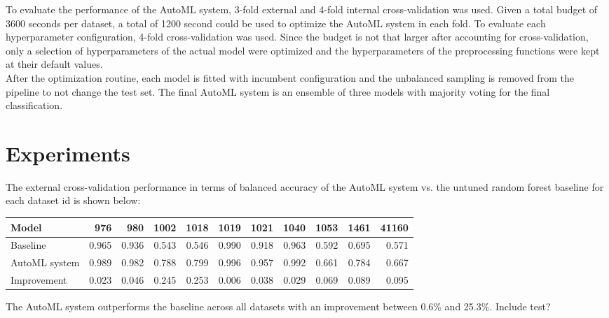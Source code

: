 \documentclass[11pt]{article}
\begin{document}
To evaluate the performance of the AutoML system, 3-fold external and 4-fold internal cross-validation was used. Given a total budget of 3600 seconds per dataset, a total of 1200 second could be used to optimize the AutoML system in each fold. To evaluate each hyperparameter configuration, 4-fold cross-validation was used. Since the budget is not that larger after accounting for cross-validation, only a selection of hyperparameters of the actual model were optimized and the hyperparameters of the preprocessing functions were kept at their default values. \\

After the optimization routine, each model is fitted with incumbent configuration and the unbalanced sampling is removed from the pipeline to not change the test set. The final AutoML system is an ensemble of three models with majority voting for the final classification. 

\section{Experiments}

The external cross-validation performance in terms of balanced accuracy of the AutoML system vs. the untuned random forest baseline for each dataset id is shown below:

\begin{table}[H]
\begin{tabular}{lrrrrrrrrrr}
\toprule
        Model &   976 &   980 &  1002 &  1018 &  1019 &  1021 &  1040 &  1053 &  1461 &  41160 \\
\midrule
     Baseline & 0.965 & 0.936 & 0.543 & 0.546 & 0.990 & 0.918 & 0.963 & 0.592 & 0.695 &  0.571 \\
AutoML system & 0.989 & 0.982 & 0.788 & 0.799 & 0.996 & 0.957 & 0.992 & 0.661 & 0.784 &  0.667 \\
\midrule
  Improvement & 0.023 & 0.046 & 0.245 & 0.253 & 0.006 & 0.038 & 0.029 & 0.069 & 0.089 &  0.095 \\
\bottomrule
\end{tabular}
\end{table}

The AutoML system outperforms the baseline across all datasets with an improvement between 0.6\% and 25.3\%. Include test? \\
\end{document}
